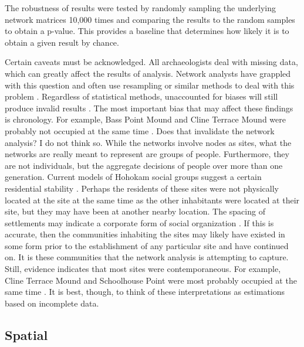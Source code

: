 \documentclass[]{interact}
\theoremstyle{plain}%
\theoremstyle{definition}
\theoremstyle{remark}
\begin{document}
The robustness of results were tested by randomly sampling the
underlying network matrices 10,000 times and comparing the results to
the random samples to obtain a p-value. This provides a baseline that
determines how likely it is to obtain a given result by chance.

Certain caveats must be acknowledged. All archaeologists deal with
missing data, which can greatly affect the results of analysis. Network
analysts have grappled with this question and often use resampling or
similar methods to deal with this problem
\citep{Bischoff2021-sf, Bolland1988-zm, Borgatti2006-jl, Brughmans2023-uj, Costenbader2003-st, Galaskiewicz1991-qb, Gjesfjeld2015-hw, Lee2009-wr, Rivera-Hutinel2012-ik}.
Regardless of statistical methods, unaccounted for biases will still
produce invalid results \citep{Bischoff2021-sf}. The most important bias
that may affect these findings is chronology. For example, Bass Point
Mound and Cline Terrace Mound were probably not occupied at the same
time \citep{Jacobs1997-ob, Lindauer1995-wq}. Does that invalidate the
network analysis? I do not think so. While the networks involve nodes as
sites, what the networks are really meant to represent are groups of
people. Furthermore, they are not individuals, but the aggregate
decisions of people over more than one generation. Current models of
Hohokam social groups suggest a certain residential stability
\citep[p.~336]{Craig2017-rg}. Perhaps the residents of these sites were
not physically located at the site at the same time as the other
inhabitants were located at their site, but they may have been at
another nearby location. The spacing of settlements may indicate a
corporate form of social organization
\citep[p.96]{Clark2004-uw, Rice1998-rz}. If this is accurate, then the
communities inhabiting the sites may likely have existed in some form
prior to the establishment of any particular site and have continued on.
It is these communities that the network analysis is attempting to
capture. Still, evidence indicates that most sites were contemporaneous.
For example, Cline Terrace Mound and Schoolhouse Point were most
probably occupied at the same time \citep{Lyons2013-ya}. It is best,
though, to think of these interpretations as estimations based on
incomplete data.

\hypertarget{spatial}{%
\subsection*{Spatial}\label{spatial}}
\end{document}
